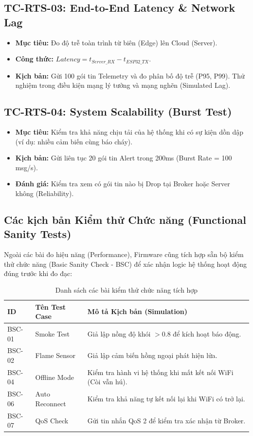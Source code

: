 \documentclass[12pt,a4paper]{report}
\begin{document}
\subsection{TC-RTS-03: End-to-End Latency \& Network Lag}
\begin{itemize}
    \item \textbf{Mục tiêu:} Đo độ trễ toàn trình từ biên (Edge) lên Cloud (Server).
    \item \textbf{Công thức:} $Latency = t_{Server\_RX} - t_{ESP32\_TX}$.
    \item \textbf{Kịch bản:} Gửi 100 gói tin Telemetry và đo phân bố độ trễ (P95, P99). Thử nghiệm trong điều kiện mạng lý tưởng và mạng nghẽn (Simulated Lag).
\end{itemize}

\subsection{TC-RTS-04: System Scalability (Burst Test)}
\begin{itemize}
    \item \textbf{Mục tiêu:} Kiểm tra khả năng chịu tải của hệ thống khi có sự kiện dồn dập (ví dụ: nhiều cảm biến cùng báo cháy).
    \item \textbf{Kịch bản:} Gửi liên tục 20 gói tin Alert trong 200ms (Burst Rate = 100 msg/s).
    \item \textbf{Đánh giá:} Kiểm tra xem có gói tin nào bị Drop tại Broker hoặc Server không (Reliability).
\end{itemize}

\subsection{Các kịch bản Kiểm thử Chức năng (Functional Sanity Tests)}
Ngoài các bài đo hiệu năng (Performance), Firmware cũng tích hợp sẵn bộ kiểm thử chức năng (Basic Sanity Check - BSC) để xác nhận logic hệ thống hoạt động đúng trước khi đo đạc:

\begin{table}[H]
\centering
\begin{tabular}{|l|l|l|}
\hline
\textbf{ID} & \textbf{Tên Test Case} & \textbf{Mô tả Kịch bản (Simulation)} \\ \hline
BSC-01 & Smoke Test & Giả lập nồng độ khói $>0.8$ để kích hoạt báo động. \\ \hline
BSC-02 & Flame Sensor & Giả lập cảm biến hồng ngoại phát hiện lửa. \\ \hline
BSC-04 & Offline Mode & Kiểm tra hành vi hệ thống khi mất kết nối WiFi (Còi vẫn hú). \\ \hline
BSC-06 & Auto Reconnect & Kiểm tra khả năng tự kết nối lại khi WiFi có trở lại. \\ \hline
BSC-07 & QoS Check & Gửi tin nhắn QoS 2 để kiểm tra xác nhận từ Broker. \\ \hline
\end{tabular}
\caption{Danh sách các bài kiểm thử chức năng tích hợp}
\end{table}
\end{document}
